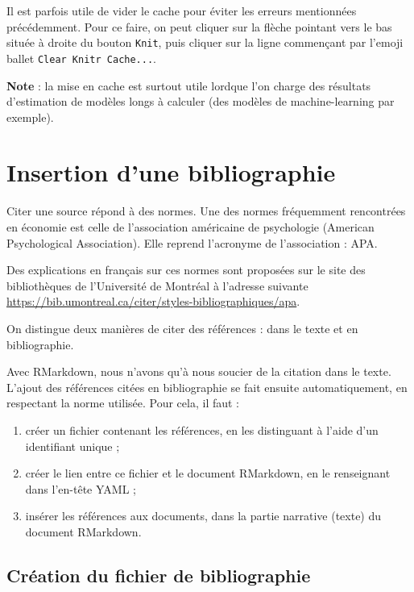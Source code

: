\documentclass[
  11pt,
]{book}
\providecommand{\tightlist}{%
  \setlength{\itemsep}{0pt}\setlength{\parskip}{0pt}}
\numberwithin{equation}{section}
\numberwithin{countremarque}{section}
\newenvironment{notebox}{
  \begin{tcolorbox}[breakable, colback=jaune,coltext=black,
                  colframe=grisfonce]}
 {\end{tcolorbox}}
\begin{document}
Il est parfois utile de vider le cache pour éviter les erreurs mentionnées précédemment. Pour ce faire, on peut cliquer sur la flèche pointant vers le bas située à droite du bouton \texttt{Knit}, puis cliquer sur la ligne commençant par l'emoji ballet \texttt{Clear\ Knitr\ Cache...}.

\begin{notebox}
\textbf{Note} : la mise en cache est surtout utile lordque l'on charge des résultats d'estimation de modèles longs à calculer (des modèles de machine-learning par exemple).

\end{notebox}

\hypertarget{insertion-dune-bibliographie}{%
\section{Insertion d'une bibliographie}\label{insertion-dune-bibliographie}}

Citer une source répond à des normes. Une des normes fréquemment rencontrées en économie est celle de l'association américaine de psychologie (American Psychological Association). Elle reprend l'acronyme de l'association : APA.

Des explications en français sur ces normes sont proposées sur le site des bibliothèques de l'Université de Montréal à l'adresse suivante \url{https://bib.umontreal.ca/citer/styles-bibliographiques/apa}.

On distingue deux manières de citer des références : dans le texte et en bibliographie.

Avec RMarkdown, nous n'avons qu'à nous soucier de la citation dans le texte. L'ajout des références citées en bibliographie se fait ensuite automatiquement, en respectant la norme utilisée. Pour cela, il faut :

\begin{enumerate}
\def\labelenumi{\arabic{enumi}.}
\tightlist
\item
  créer un fichier contenant les références, en les distinguant à l'aide d'un identifiant unique ;
\item
  créer le lien entre ce fichier et le document RMarkdown, en le renseignant dans l'en-tête YAML ;
\item
  insérer les références aux documents, dans la partie narrative (texte) du document RMarkdown.
\end{enumerate}

\hypertarget{cruxe9ation-du-fichier-de-bibliographie}{%
\subsection{Création du fichier de bibliographie}\label{cruxe9ation-du-fichier-de-bibliographie}}
\end{document}

